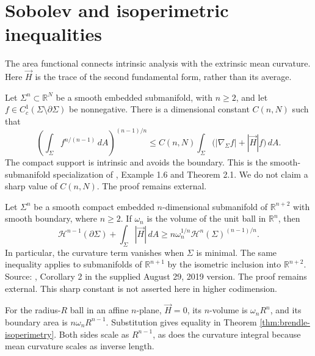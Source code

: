 \chapter{Sobolev and isoperimetric inequalities}\label{sec:submanifold-inequalities}
The area functional connects intrinsic analysis with the extrinsic mean curvature. Here $\vec H$ is the trace of the second fundamental form, rather than its average.

\begin{theorem}\label{thm:michael-simon}
Let $\Sigma^n\subset\mathbb R^N$ be a smooth embedded submanifold, with $n\geq2$, and let $f\in C_c^1(\Sigma\setminus\partial\Sigma)$ be nonnegative. There is a dimensional constant $C(n,N)$ such that
\[
 \left(\int_\Sigma f^{n/(n-1)}\,dA\right)^{(n-1)/n}
 \leq C(n,N)\int_\Sigma\bigl(|\nabla_\Sigma f|+|\vec H|f\bigr)\,dA.
\]
The compact support is intrinsic and avoids the boundary. This is the smooth-submanifold specialization of \cite{MS73}, Example 1.6 and Theorem 2.1. We do not claim a sharp value of $C(n,N)$. The proof remains external.
\end{theorem}

\begin{theorem}\label{thm:brendle-isoperimetry}
Let $\Sigma^n$ be a smooth compact embedded $n$-dimensional submanifold of $\mathbb R^{n+2}$ with smooth boundary, where $n\geq2$. If $\omega_n$ is the volume of the unit ball in $\mathbb R^n$, then
\[
 \mathcal H^{n-1}(\partial\Sigma)+\int_\Sigma |\vec H|\,dA
 \geq n\omega_n^{1/n}\mathcal H^n(\Sigma)^{(n-1)/n}.
\]
In particular, the curvature term vanishes when $\Sigma$ is minimal. The same inequality applies to submanifolds of $\mathbb R^{n+1}$ by the isometric inclusion into $\mathbb R^{n+2}$. Source: \cite{Brendle19}, Corollary 2 in the supplied August 29, 2019 version. The proof remains external. This sharp constant is not asserted here in higher codimension.
\end{theorem}

\begin{example}\label{ex:flat-ball-isoperimetry}
For the radius-$R$ ball in an affine $n$-plane, $\vec H=0$, its $n$-volume is $\omega_nR^n$, and its boundary area is $n\omega_nR^{n-1}$. Substitution gives equality in Theorem \ref{thm:brendle-isoperimetry}. Both sides scale as $R^{n-1}$, as does the curvature integral because mean curvature scales as inverse length.
\end{example}
